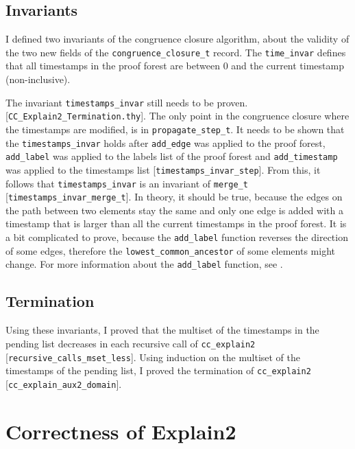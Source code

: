 \subsection{Invariants}\label{subsection:invariants}

I defined two invariants of the congruence closure algorithm, about the validity of the two new fields of the \lstinline|congruence_closure_t| record. The \lstinline|time_invar| defines that all timestamps in the proof forest are between 0 and the current timestamp (non-inclusive).

The invariant \lstinline|timestamps_invar| still needs to be proven. [\lstinline|CC_Explain2_Termination.thy|]. The only point in the congruence closure where the timestamps are modified, is in \lstinline|propagate_step_t|. It needs to be shown that the \lstinline|timestamps_invar| holds after \lstinline|add_edge| was applied to the proof forest, \lstinline|add_label| was applied to the labels list of the proof forest and \lstinline|add_timestamp| was applied to the timestamps list [\lstinline|timestamps_invar_step|]. From this, it follows that \lstinline|timestamps_invar| is an invariant of \lstinline|merge_t| [\lstinline|timestamps_invar_merge_t|]. In theory, it should be true, because  the edges on the path between two elements stay the same and only one edge is added with a timestamp that is larger than all the current timestamps in the proof forest. It is a bit complicated to prove, because the \lstinline|add_label| function reverses the direction of some edges, therefore the \lstinline|lowest_common_ancestor| of some elements might change. For more information about the \lstinline|add_label| function, see \cite{rebi}.

\subsection{Termination}

Using these invariants, I proved that the multiset of the timestamps in the pending list decreases in each recursive call of \lstinline|cc_explain2| [\lstinline|recursive_calls_mset_less|].
Using induction on the multiset of the timestamps of the pending list, I proved the termination of \lstinline|cc_explain2| [\lstinline|cc_explain_aux2_domain|].

\section{Correctness of Explain2}

